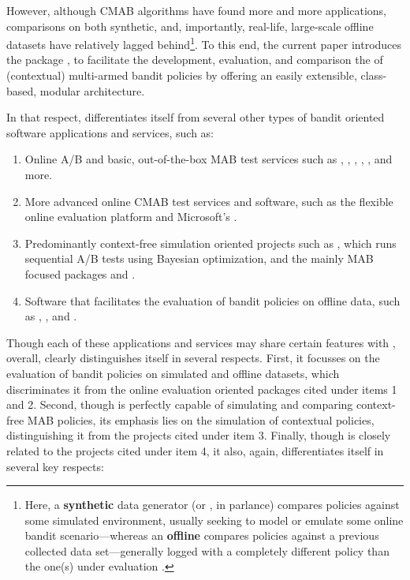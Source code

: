 \documentclass{jss}
\begin{document}
However, although CMAB algorithms have found more and more applications, comparisons on both synthetic, and, importantly, real-life, large-scale offline datasets \citep{Li2011} have relatively lagged behind\footnote{Here, a \textbf{synthetic} data generator (or , in  parlance) compares policies against some simulated environment, usually seeking to model or emulate some online bandit scenario---whereas an \textbf{offline}  compares policies against a previous collected data set---generally logged with a completely different policy than the one(s) under evaluation \citep{Li2012}.}. To this end, the current paper introduces the  package , to facilitate the development, evaluation, and comparison the of (contextual) multi-armed bandit policies by offering an easily extensible, class-based, modular architecture.

In that respect,  differentiates itself from several other types of bandit oriented software applications and services, such as:

\begin{enumerate}
          \item[1)]Online A/B and basic, out-of-the-box MAB test services such as  \citep{BibEntry2018Aug2},  \citep{BibEntry2018Aug3},  \citep{BibEntry2018Aug1},  \citep{BibEntry2018AugA},  \citep{BibEntry2018AugB}, and more.
          \item[2)]More advanced online CMAB test services and software, such as the flexible online evaluation platform  \citep{kruijswijk2018streamingbandit} and Microsoft's  \citep{Agarwal2016}.
          \item[3)]Predominantly context-free simulation oriented projects such as  \citep{2018}, which runs sequential A/B tests using Bayesian optimization, and the mainly MAB focused  packages  \citep{striatum} and  \citep{SMPyBandits}.
          \item[4)]Software that facilitates the evaluation of bandit policies on offline data, such as  \citep{Langford2007},  \citep{Hido2013}, and  \citep{Abadi2016}.
\end{enumerate}

Though each of these applications and services may share certain features with , overall,  clearly distinguishes itself in several respects.  First, it focusses on the evaluation of bandit policies on simulated and offline datasets, which discriminates it from the online evaluation oriented packages cited under items 1 and 2. Second, though  is perfectly capable of simulating and comparing context-free MAB policies, its emphasis lies on the simulation of contextual policies, distinguishing it from the projects cited under item 3. Finally, though  is closely related to the projects cited under item 4, it also, again, differentiates itself in several key respects:
\end{document}
